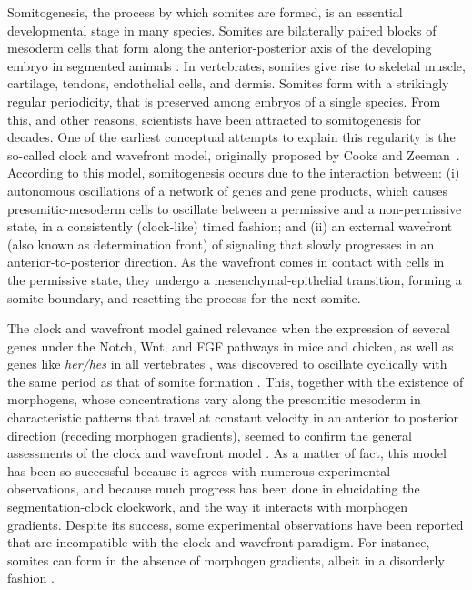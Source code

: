 \documentclass[%
 preprint,
 aip, 
 amsmath,amssymb,
]{revtex4-2}
\begin{document}
Somitogenesis, the process by which somites are formed, is an essential developmental stage in many species. Somites are bilaterally paired blocks of mesoderm cells that form along the anterior-posterior axis of the developing embryo in segmented animals \cite{Maroto2012}. In vertebrates, somites give rise to skeletal muscle, cartilage, tendons, endothelial cells, and dermis. Somites form with a strikingly regular periodicity, that is preserved among embryos of a single species. From this, and other reasons, scientists have been attracted to somitogenesis for decades. One of the earliest conceptual attempts to explain this regularity is the so-called clock and wavefront model, originally proposed by Cooke and Zeeman~\cite{Cooke1976}. According to this model, somitogenesis occurs due to the interaction between: (i) autonomous oscillations of a network of genes and gene products, which causes presomitic-mesoderm cells to oscillate between a permissive and a non-permissive state, in a consistently (clock-like) timed fashion; and (ii) an external wavefront (also known as determination front) of signaling that slowly progresses in an anterior-to-posterior direction. As the wavefront comes in contact with cells in the permissive state, they undergo a mesenchymal-epithelial transition, forming a somite boundary, and resetting the process for the next somite.
	
The clock and wavefront model gained relevance when the expression of several genes under the Notch, Wnt, and FGF pathways in mice and chicken, as well as genes like \textit{her/hes} in all vertebrates \cite{Schorter2012}, was discovered to oscillate cyclically with the same period as that of somite formation \cite{Palmeirim1997, Pourquie2001, Gibb2010, Pourquie2011}. This, together with the existence of morphogens, whose concentrations vary along the presomitic mesoderm in characteristic patterns that travel at constant velocity in an anterior to posterior direction (receding morphogen gradients), seemed to confirm the general assessments of the clock and wavefront model \cite{Gibb2010, Pourquie2011, Dubrulle2001}. As a matter of fact, this model has been so successful because it agrees with numerous experimental observations, and because much progress has been done in elucidating the segmentation-clock clockwork, and the way it interacts with morphogen gradients. Despite its success, some experimental observations have been reported that are incompatible with the clock and wavefront paradigm. For instance, somites can form in the absence of morphogen gradients, albeit in a disorderly fashion \cite{Naiche2011,Dias2014}.
	
\end{document}
